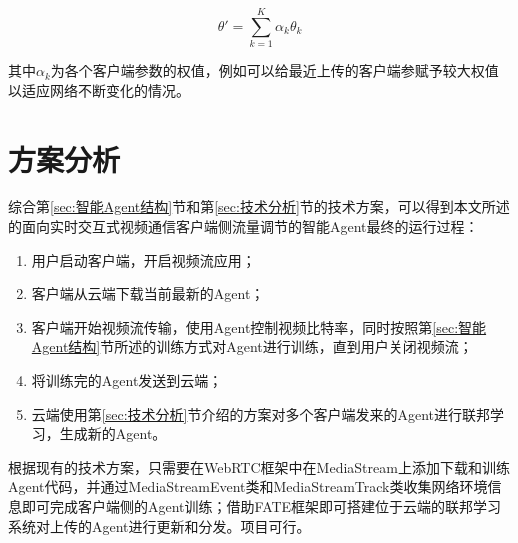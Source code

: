\documentclass[a4paper]{ctexart}
\begin{document}
$$\theta'=\sum_{k=1}^K\alpha_k\theta_k$$

其中$\alpha_k$为各个客户端参数的权值，例如可以给最近上传的客户端参赋予较大权值以适应网络不断变化的情况。

\section{方案分析}

综合第\ref{sec:智能Agent结构}节和第\ref{sec:技术分析}节的技术方案，可以得到本文所述的面向实时交互式视频通信客户端侧流量调节的智能Agent最终的运行过程：

\begin{enumerate}[label=\arabic*、]
	\item 用户启动客户端，开启视频流应用；
	\item 客户端从云端下载当前最新的Agent；
	\item 客户端开始视频流传输，使用Agent控制视频比特率，同时按照第\ref{sec:智能Agent结构}节所述的训练方式对Agent进行训练，直到用户关闭视频流；
	\item 将训练完的Agent发送到云端；
	\item 云端使用第\ref{sec:技术分析}节介绍的方案对多个客户端发来的Agent进行联邦学习，生成新的Agent。
\end{enumerate}

根据现有的技术方案\cite{WebRTCRealTimeCommunicationBrowsers,FedAIOrgFederatedAI,mao2020real}，只需要在WebRTC框架中在MediaStream上添加下载和训练Agent代码，并通过MediaStreamEvent类和MediaStreamTrack类收集网络环境信息即可完成客户端侧的Agent训练；借助FATE框架即可搭建位于云端的联邦学习系统对上传的Agent进行更新和分发。项目可行。


\end{document}
